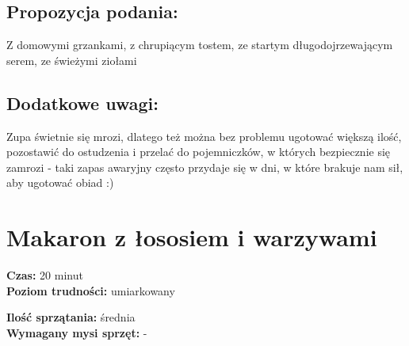 \documentclass[a4paper,10pt]{book}
\begin{document}
\vspace{0.5cm} 

\small
\section*{Propozycja podania:}
Z domowymi grzankami, z chrupiącym tostem, ze startym długodojrzewającym serem, ze świeżymi ziołami

\vspace{0.3cm}

\section*{Dodatkowe uwagi:}
Zupa świetnie się mrozi, dlatego też można bez problemu ugotować większą ilość, pozostawić do ostudzenia i przelać do pojemniczków, w których bezpiecznie się zamrozi - taki zapas awaryjny często przydaje się w dni, w które brakuje nam sił, aby ugotować obiad :)


\chapter{Makaron z łososiem i warzywami}

\vspace{0.1cm}
\small
\begin{minipage}{0.45\textwidth}
    \noindent \textbf{Czas:} 20 minut \\
    \textbf{Poziom trudności:} umiarkowany
\end{minipage}
\begin{minipage}{0.45\textwidth}
    \noindent \textbf{Ilość sprzątania:} średnia\\
    \textbf{Wymagany mysi sprzęt:} -
\end{minipage}
\normalsize
\vspace{0.5cm}
\end{document}
